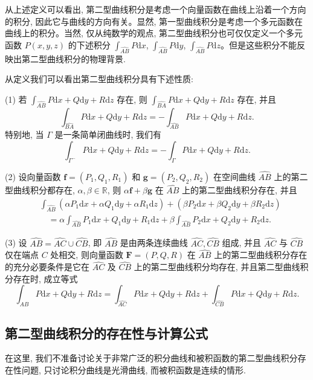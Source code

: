 从上述定义可以看出, 第二型曲线积分是考虑一个向量函数在曲线上沿着一个方向的积分, 因此它与曲线的方向有关。显然, 第一型曲线积分是考虑一个多元函数在曲线上的积分。当然, 仅从纯数学的观点, 第二型曲线积分也可仅仅定义一个多元函数 $P(x,y,z)$ 的下述积分 $\int_{\widehat{AB}}P\mathrm dx$, $\int_{\widehat{AB}}P\mathrm dy$, $\int_{\widehat{AB}}P\mathrm dz$。但是这些积分不能反映出第二型曲线积分的物理背景.

从定义我们可以看出第二型曲线积分具有下述性质:

(1) 若 $\int_{\widehat{AB}}P\mathrm dx+Q\mathrm dy+R\mathrm dz$ 存在, 则 $\int_{\widehat{BA}}P\mathrm dx+Q\mathrm dy+R\mathrm dz$ 存在, 并且
\[
  \int_{\widehat{BA}}P\mathrm dx+Q\mathrm dy+R\mathrm dz
  =-\int_{\widehat{AB}}P\mathrm dx+Q\mathrm dy+R\mathrm dz.
\]
特别地, 当 $\Gamma$ 是一条简单闭曲线时, 我们有
\[
  \int_{\Gamma^-}P\mathrm dx+Q\mathrm dy+R\mathrm dz
  =-\int_\Gamma P\mathrm dx+Q\mathrm dy+R\mathrm dz.
\]

(2) 设向量函数 $\boldsymbol f=(P_1,Q_1,R_1)$ 和 $\boldsymbol g=(P_2,Q_2,R_2)$ 在空间曲线 $\widehat{AB}$ 上的第二型曲线积分都存在, $\alpha,\beta\in\mathbb R$, 则 $\alpha\boldsymbol f+\beta\boldsymbol g$ 在 $\widehat{AB}$ 上的第二型曲线积分存在, 并且
\[
\begin{aligned}
  &\int_{\widehat{AB}}(\alpha P_1\mathrm dx+\alpha Q_1\mathrm dy+\alpha R_1\mathrm dz)
  +(\beta P_2\mathrm dx+\beta Q_2\mathrm dy+\beta R_2\mathrm dz)\\
  &\quad=\alpha\int_{\widehat{AB}}P_1\mathrm dx+Q_1\mathrm dy+R_1\mathrm dz
  +\beta\int_{\widehat{AB}}P_2\mathrm dx+Q_2\mathrm dy+R_2\mathrm dz.
\end{aligned}
\]

(3) 设 $\widehat{AB}=\widehat{AC}\cup\widehat{CB}$, 即 $\widehat{AB}$ 是由两条连续曲线 $\widehat{AC},\widehat{CB}$ 组成, 并且 $\widehat{AC}$ 与 $\widehat{CB}$ 仅在端点 $C$ 处相交, 则向量函数 $\boldsymbol F=(P,Q,R)$ 在 $\widehat{AB}$ 上的第二型曲线积分存在的充分必要条件是它在 $\widehat{AC}$ 及 $\widehat{CB}$ 上的第二型曲线积分均存在, 并且第二型曲线积分存在时, 成立等式
\[
  \int_{\widehat{AB}}P\mathrm dx+Q\mathrm dy+R\mathrm dz
  =\int_{\widehat{AC}}P\mathrm dx+Q\mathrm dy+R\mathrm dz
  +\int_{\widehat{CB}}P\mathrm dx+Q\mathrm dy+R\mathrm dz.
\]

\subsection{第二型曲线积分的存在性与计算公式}
\label{subsec:ma-16-2-2}

在这里, 我们不准备讨论关于非常广泛的积分曲线和被积函数的第二型曲线积分存在性问题, 只讨论积分曲线是光滑曲线, 而被积函数是连续的情形.

